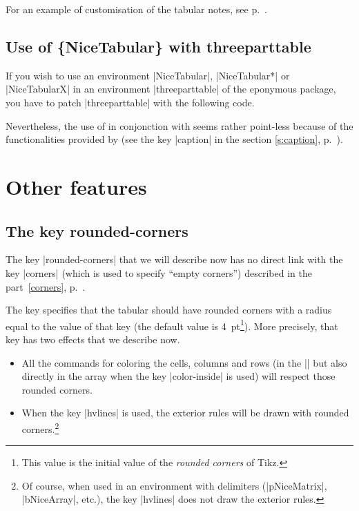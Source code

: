 \documentclass[dvipsnames]{article}%
\begin{document}

\bigskip
For an example of customisation of the tabular notes, see p.~\pageref{ex:notes}.


\subsection{Use of \{NiceTabular\} with threeparttable}


If you wish to use an environment |{NiceTabular}|, |{NiceTabular*}| or
|{NiceTabularX}| in an environment |{threeparttable}| of the eponymous package,
you have to patch |{threeparttable}| with the following code.

\begin{Code}
\makeatletter
{}
  {}
\makeatother
\end{Code}

Nevertheless, the use of  in conjonction with
 seems rather point-less because of the functionalities
provided by  (see the key |caption| in the section
\ref{s:caption}, p.~\pageref{s:caption}).


\section{Other features}

\subsection{The key rounded-corners}

\label{tabular-rounded-corners}

The key |rounded-corners| that we will describe now has no direct link with
the key |corners| (which is used to specify ``empty corners'') described in
the part~\ref{corners}, p.~\pageref{corners}.

\smallskip
The key  specifies that the tabular should have
rounded corners with a radius equal to the value of that key (the default value is
4~pt\footnote{This value is the initial value of the \emph{rounded corners} of
  Tikz.}). More precisely, that key has two effects that we describe now.
\begin{itemize}
\item All the commands for coloring the cells, columns and rows (in the
|\CodeBefore| but also directly in the array when the key |color-inside| is
used) will respect those rounded corners.

\item When the key |hvlines| is used, the exterior rules will be drawn with
rounded corners.\footnote{Of course, when used in an environment with delimiters
(|{pNiceMatrix}|, |{bNiceArray}|, etc.), the key |hvlines| does not draw the
exterior rules.}
\end{itemize}
\end{document}
